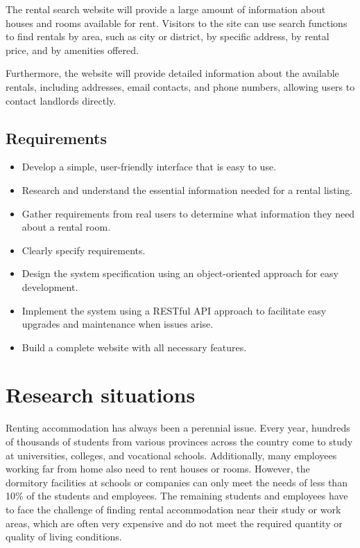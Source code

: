 \documentclass[../Main.tex]{subfiles}
\begin{document}
The rental search website will provide a large amount of information about houses and rooms available for rent.
Visitors to the site can use search functions to find rentals by area, such as city or district, by specific address, by rental price, and by amenities offered.

Furthermore, the website will provide detailed information about the available rentals, including addresses, email contacts, and phone numbers, allowing users to contact landlords directly.

\subsection{Requirements}

\begin{itemize}
    \item Develop a simple, user-friendly interface that is easy to use.
    \item Research and understand the essential information needed for a rental listing.
    \item Gather requirements from real users to determine what information they need about a rental room.
    \item Clearly specify requirements.
    \item Design the system specification using an object-oriented approach for easy development.
    \item Implement the system using a RESTful API approach to facilitate easy upgrades and maintenance when issues arise.
    \item Build a complete website with all necessary features.
\end{itemize}

\section{Research situations}
\label{section:research}

Renting accommodation has always been a perennial issue.
Every year, hundreds of thousands of students from various provinces across the country come to study at universities, colleges, and vocational schools.
Additionally, many employees working far from home also need to rent houses or rooms.
However, the dormitory facilities at schools or companies can only meet the needs of less than 10\% of the students and employees.
The remaining students and employees have to face the challenge of finding rental accommodation near their study or work areas, which are often very expensive and do not meet the required quantity or quality of living conditions.
\end{document}
